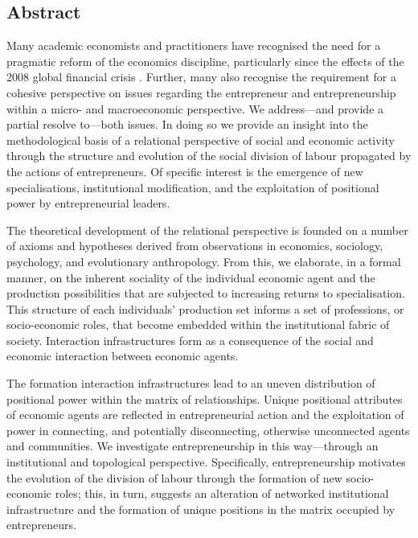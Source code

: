 \documentclass[11pt,fleqn]{book}
\begin{document}
\begin{singlespace}
\setcounter{tocdepth}{2}
\tableofcontents

\listoffigures

\chapter*{Abstract}


Many academic economists and practitioners have recognised the need for a pragmatic reform of the economics discipline, particularly since the effects of the 2008 global financial crisis \citep{Hodgson2009}. Further, many also recognise the requirement for a cohesive perspective on issues regarding the entrepreneur and entrepreneurship within a micro- and macroeconomic perspective. We address---and provide a partial resolve to---both issues. In doing so we provide an insight into the methodological basis of a relational perspective of social and economic activity through the structure and evolution of the social division of labour propagated by the actions of entrepreneurs. Of specific interest is the emergence of new specialisations, institutional modification, and the exploitation of positional power by entrepreneurial leaders.

The theoretical development of the relational perspective is founded on a number of axioms and hypotheses derived from observations in economics, sociology, psychology, and evolutionary anthropology. From this, we elaborate, in a formal manner, on the inherent sociality of the individual economic agent and the production possibilities that are subjected to increasing returns to specialisation. This structure of each individuals' production set informs a set of professions, or socio-economic roles, that become embedded within the institutional fabric of society. Interaction infrastructures form as a consequence of the social and economic interaction between economic agents.

The formation interaction infrastructures lead to an uneven distribution of positional power within the matrix of relationships. Unique positional attributes of economic agents are reflected in entrepreneurial action and the exploitation of power in connecting, and potentially disconnecting, otherwise unconnected agents and communities. We investigate entrepreneurship in this way---through an institutional and topological perspective. Specifically, entrepreneurship motivates the evolution of the division of labour through the formation of new socio-economic roles; this, in turn, suggests an alteration of networked institutional infrastructure and the formation of unique positions in the matrix occupied by entrepreneurs.


\end{singlespace}
\end{document}
